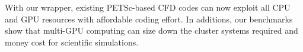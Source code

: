 With our wrapper, existing PETSc-based CFD codes 
can now exploit all CPU and GPU resources with affordable coding effort.
In additions, our benchmarks show that multi-GPU computing can size down the 
cluster systems required and money cost for scientific simulations.

